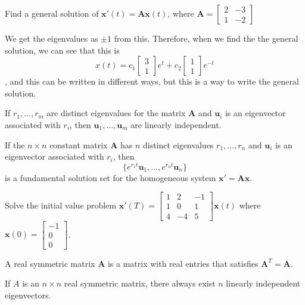 \documentclass[../diffeq.tex]{subfiles}
\begin{document}
\begin{example}
    Find a general solution of $\textbf{x}'(t)=\textbf{Ax}(t)$, where $\textbf{A}=\begin{bmatrix}
        2 & -3\\
        1 & -2
    \end{bmatrix}$

    We get the eigenvalues as $\pm 1$ from this. Therefore, when we find the the general solution, we can see that this is 
    \[ x(t)=c_1\begin{bmatrix}
        3\\1
    \end{bmatrix}e^t + c_2\begin{bmatrix}
        1\\1
    \end{bmatrix}e^{-t} \], and this can be written in different ways, but this is a way to write the general solution.
\end{example}

\begin{theorem}
    If $r_1,\dots,r_m$ are distinct eigenvalues for the matrix $\textbf{A}$ and $\textbf{u}_i$ is an eigenvector associated with $r_i$, then $\textbf{u}_1,\dots,\textbf{u}_m$ are linearly independent.
\end{theorem}

\pagebreak
\begin{corollary}
    If the $n\times n$ constant matrix $\textbf{A}$ has $n$ distinct eigenvalues $r_1,\dots,r_n$ and $\textbf{u}_i$ is an eigenvector associated with $r_i$, then 
    \[ \{ e^{r_1t}\textbf{u}_1,\dots,e^{r_nt}\textbf{u}_n \} \]
    is a fundamental solution set for the homogeneous system $\textbf{x}'=\textbf{Ax}$.
\end{corollary}

\ex Solve the initial value problem $\textbf{x}'(T)=\begin{bmatrix}
    1 & 2 & -1 \\
    1 & 0 & 1 \\
    4 & -4 & 5
\end{bmatrix}\textbf{x}(t)$ where $\textbf{x}(0)=\begin{bmatrix}
    -1\\0\\0
\end{bmatrix}$.

\begin{definition}
    A real symmetric matrix $\textbf{A}$ is a matrix with real entries that satisfies $\textbf{A}^T=\textbf{A}$.
\end{definition}
If $A$ is an $n\times n$ real symmetric matrix, there always exist $n$ linearly independent eigenvectors.
\end{document}
